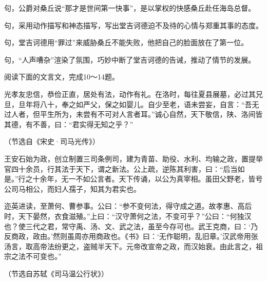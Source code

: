 \documentclass[11pt,a4paper]{ctexart}
\begin{document}
\begin{choices}
\item 句，公爵对桑丘说“那才是世间第一快事”，是以掌权的快感桑丘赴任海岛总督。
\item 句，采用动作描写和神态描写，写出堂吉诃德迫不及待的心情与郑重其事的态度。
\item 句，堂吉诃德用“罪过”来威胁桑丘不能失败，他把自己的脸面放在了第一位。
\item 句，“人声嘈杂”渲染了氛围，巧妙中断了堂吉诃德的告诫，推动了情节的发展。
\end{choices}


\par\vspace{2.2em}


\par\vspace{2.2em}

阅读下面的文言文，完成10～14题。

\begin{materialtext}
光孝友忠信，恭俭正直，居处有法，动作有礼。在洛时，每往夏县展墓，必过其兄旦，旦年将八十，奉之如严父，保之如婴儿。自少至老，语未尝妄，自言：“吾无过人者，但平生所为，未尝有不可对人言者耳。”诚心自然，天下敬信，陕、洛间皆其德，有不善，曰：“君实得无知之乎？”
\end{materialtext}
\begin{flushright}（节选自《宋史·司马光传》）\end{flushright}

\begin{materialtext}
王安石始为政，创立制置三司条例司，建为青苗、助役、水利、均输之政，置提举官四十余员，行其法于天下，谓之新法。公上疏，逆陈其利害，曰：“后当如是。”行之十余年，无一不如公言者。天下传诵，以公为真宰相。虽田父野老，皆号公司马相公，而妇人孺子，知其为君实也。

迩英进读，至萧何、曹参事。公曰：“参不变何法，得守成之道。故孝惠、高后时，天下晏然，衣食滋殖。”上曰：“汉守萧何之法，不变可乎？”公曰：“何独汉也？使三代之君，常守禹、汤、文、武之法，虽至今存可也。武王克商，曰：‘乃反商政，政由。’然则虽周亦用商政也。《书》曰：‘无作聪明，乱旧章。’汉武帝用张汤言，取高帝法纷更之，盗贼半天下。元帝改宣帝之政，而汉始衰。由此言之，祖宗之法不可变也。”
\end{materialtext}
\begin{flushright}（节选自苏轼《司马温公行状》）\end{flushright}
\end{document}
